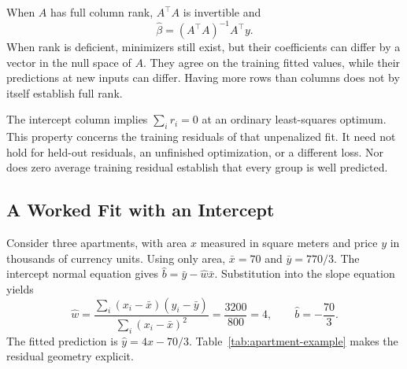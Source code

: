 When $A$ has full column rank, $A^\top A$ is invertible and
\[
\hat\beta=(A^\top A)^{-1}A^\top y.
\]
When rank is deficient, minimizers still exist, but their coefficients can differ by a vector in the null space of $A$. They agree on the training fitted values, while their predictions at new inputs can differ. Having more rows than columns does not by itself establish full rank.

The intercept column implies $\sum_i r_i=0$ at an ordinary least-squares optimum. This property concerns the training residuals of that unpenalized fit. It need not hold for held-out residuals, an unfinished optimization, or a different loss. Nor does zero average training residual establish that every group is well predicted.

\par\addvspace{\intextsep}\noindent\begin{minipage}{\linewidth}
\centering
{}
\label{fig:regression-residuals}
\end{minipage}\par\addvspace{\intextsep}

\par\medskip\noindent\begin{minipage}{\linewidth}
\subsection{A Worked Fit with an Intercept}

Consider three apartments, with area $x$ measured in square meters and price $y$ in thousands of currency units. Using only area, $\bar x=70$ and $\bar y=770/3$. The intercept normal equation gives $\hat b=\bar y-\hat w\bar x$. Substitution into the slope equation yields
\[
\hat w=
\frac{\sum_i(x_i-\bar x)(y_i-\bar y)}{\sum_i(x_i-\bar x)^2}
=\frac{3200}{800}=4,
\qquad
\hat b=-\frac{70}{3}.
\]
The fitted prediction is $\hat y=4x-70/3$. Table~\ref{tab:apartment-example} makes the residual geometry explicit.
\end{minipage}\par

